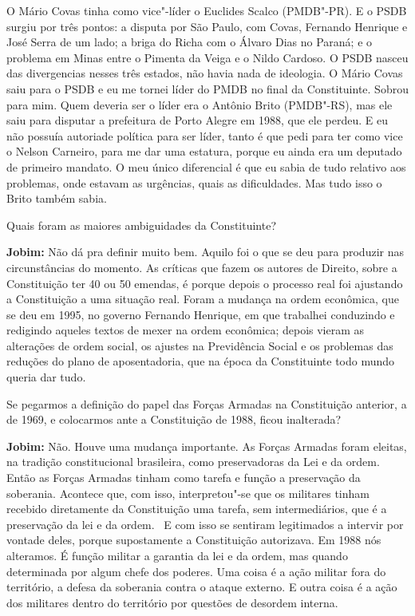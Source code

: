 O Mário Covas tinha como vice"-líder o Euclides Scalco (PMDB"-PR). E o
PSDB surgiu por três pontos: a disputa por São Paulo, com Covas,
Fernando Henrique e José Serra de um lado; a briga do Richa com o Álvaro
Dias no Paraná; e o problema em Minas entre o Pimenta da Veiga e o Nildo
Cardoso. O PSDB nasceu das divergencias nesses três estados, não havia
nada de ideologia. O Mário Covas saiu para o PSDB e eu me tornei líder
do PMDB no final da Constituinte. Sobrou para mim. Quem deveria ser o
líder era o Antônio Brito (PMDB"-RS), mas ele saiu para disputar a
prefeitura de Porto Alegre em 1988, que ele perdeu. E eu não possuía
autoriade política para ser líder, tanto é que pedi para ter como vice o
Nelson Carneiro, para me dar uma estatura, porque eu ainda era um
deputado de primeiro mandato. O meu único diferencial é que eu sabia de
tudo relativo aos problemas, onde estavam as urgências, quais as
dificuldades. Mas tudo isso o Brito também sabia.

Quais foram as maiores ambiguidades da Constituinte?

\textbf{Jobim:} Não dá pra definir muito bem. Aquilo foi o que se deu
para produzir nas circunstâncias do momento. As críticas que fazem os
autores de Direito, sobre a Constituição ter 40 ou 50 emendas, é porque
depois o processo real foi ajustando a Constituição a uma situação real.
Foram a mudança na ordem econômica, que se deu em 1995, no governo
Fernando Henrique, em que trabalhei conduzindo e redigindo aqueles
textos de mexer na ordem econômica; depois vieram as alterações de ordem
social, os ajustes na Previdência Social e os problemas das reduções do
plano de aposentadoria, que na época da Constituinte todo mundo queria
dar tudo.

Se pegarmos a definição do papel das Forças Armadas na Constituição
anterior, a de 1969, e colocarmos ante a Constituição de 1988, ficou
inalterada?

\textbf{Jobim:} Não. Houve uma mudança importante. As Forças Armadas
foram eleitas, na tradição constitucional brasileira, como preservadoras
da Lei e da ordem. Então as Forças Armadas tinham como tarefa e função a
preservação da soberania. Acontece que, com isso, interpretou"-se que os
militares tinham recebido diretamente da Constituição uma tarefa, sem
intermediários, que é a preservação da lei e da ordem.~ E com isso se
sentiram legitimados a intervir por vontade deles, porque supostamente a
Constituição autorizava. Em 1988 nós alteramos. É função militar a
garantia da lei e da ordem, mas quando determinada por algum chefe dos
poderes. Uma coisa é a ação militar fora do território, a defesa da
soberania contra o ataque externo. E outra coisa é a ação dos militares
dentro do território por questões de desordem interna.

